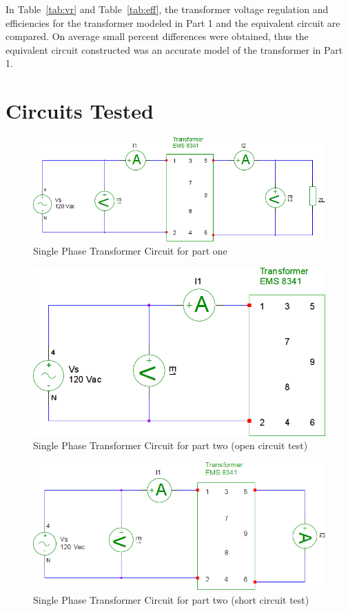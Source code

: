 \documentclass{article}
\begin{document}
In Table~\ref{tab:vr} and Table~\ref{tab:eff}, the transformer voltage
regulation and efficiencies for the transformer modeled in Part 1 and the
equivalent circuit are compared.  On average small percent differences were
obtained, thus the equivalent circuit constructed was an accurate model of the
transformer in Part 1.

\section*{Circuits Tested}
\begin{figure}[H]
  \centering
  \includegraphics[width=.8\textwidth]{img/circuit_01}
  \caption{Single Phase Transformer Circuit for part one}
  \label{fig:circuit_01}
\end{figure}

\begin{figure}[H]
  \centering
  \includegraphics[width=.8\textwidth]{img/circuit_02}
  \caption{Single Phase Transformer Circuit for part two (open circuit test)}
  \label{fig:circuit_02}
\end{figure}

\begin{figure}[H]
  \centering
  \includegraphics[width=.8\textwidth]{img/circuit_03}
  \caption{Single Phase Transformer Circuit for part two (short circuit test)}
  \label{fig:circuit_03}
\end{figure}
\end{document}
